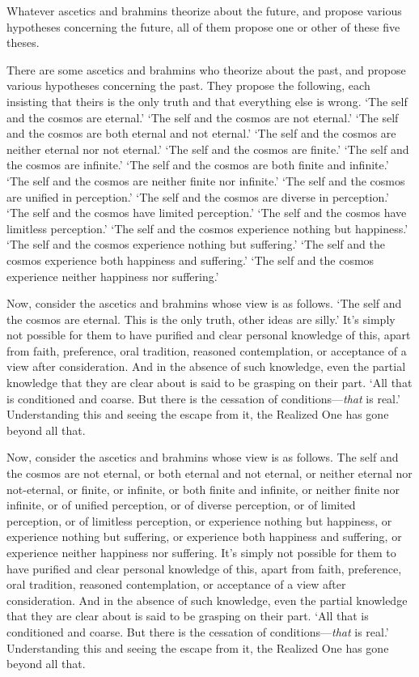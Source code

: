 \documentclass[12pt,openany]{book}%
\begin{document}
Whatever ascetics and brahmins theorize about the future, and propose various hypotheses concerning the future, all of them propose one or other of these five theses. 

There are some ascetics and brahmins who theorize about the past, and propose various hypotheses concerning the past. They propose the following, each insisting that theirs is the only truth and that everything else is wrong. ‘The self and the cosmos are eternal.’ ‘The self and the cosmos are not eternal.’ ‘The self and the cosmos are both eternal and not eternal.’ ‘The self and the cosmos are neither eternal nor not eternal.’ ‘The self and the cosmos are finite.’ ‘The self and the cosmos are infinite.’ ‘The self and the cosmos are both finite and infinite.’ ‘The self and the cosmos are neither finite nor infinite.’ ‘The self and the cosmos are unified in perception.’ ‘The self and the cosmos are diverse in perception.’ ‘The self and the cosmos have limited perception.’ ‘The self and the cosmos have limitless perception.’ ‘The self and the cosmos experience nothing but happiness.’ ‘The self and the cosmos experience nothing but suffering.’ ‘The self and the cosmos experience both happiness and suffering.’ ‘The self and the cosmos experience neither happiness nor suffering.’ 

Now, consider the ascetics and brahmins whose view is as follows. ‘The self and the cosmos are eternal. This is the only truth, other ideas are silly.’ It’s simply not possible for them to have purified and clear personal knowledge of this, apart from faith, preference, oral tradition, reasoned contemplation, or acceptance of a view after consideration. And in the absence of such knowledge, even the partial knowledge that they are clear about is said to be grasping on their part. ‘All that is conditioned and coarse. But there is the cessation of conditions—\emph{that} is real.’ Understanding this and seeing the escape from it, the Realized One has gone beyond all that. 

Now, consider the ascetics and brahmins whose view is as follows. The self and the cosmos are not eternal, or both eternal and not eternal, or neither eternal nor not-eternal, or finite, or infinite, or both finite and infinite, or neither finite nor infinite, or of unified perception, or of diverse perception, or of limited perception, or of limitless perception, or experience nothing but happiness, or experience nothing but suffering, or experience both happiness and suffering, or experience neither happiness nor suffering. It’s simply not possible for them to have purified and clear personal knowledge of this, apart from faith, preference, oral tradition, reasoned contemplation, or acceptance of a view after consideration. And in the absence of such knowledge, even the partial knowledge that they are clear about is said to be grasping on their part. ‘All that is conditioned and coarse. But there is the cessation of conditions—\emph{that} is real.’ Understanding this and seeing the escape from it, the Realized One has gone beyond all that. 
\end{document}
